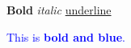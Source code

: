 ﻿\textbf{Bold}
\textit{italic}
\underline{underline}

\textcolor{blue}{This is \textbf{bold and blue}.}